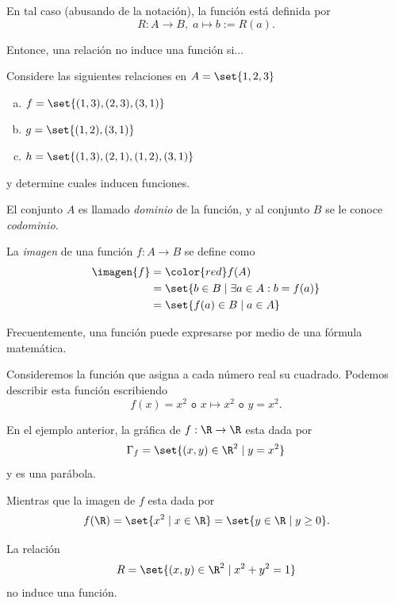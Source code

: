 	
	En tal caso (abusando de la notación), la función está definida por 
	$$
	R:A\to B, \; a \mapsto b:=R(a).
	$$



	Entonce, una relación no induce una función si...



	\begin{problema}
		Considere las siguientes relaciones en $A=\set{1,2,3}$
		\begin{enumerate}[(a)]
			\item $f=\set{(1,3),(2,3),(3,1)}$
			\item $g=\set{(1,2), (3,1)}$
			\item $h=\set{(1,3),(2,1),(1,2),(3,1)}$
		\end{enumerate}
		y determine cuales inducen funciones.
	\end{problema}
	




	El conjunto $A$ es llamado \emph{dominio} de la función, y al conjunto $B$ se le conoce \emph{codominio.}
	
	
	La \emph{imagen} de una función $f:A\to B$ se define como
	\begin{align}
		\imagen{f}&={\color{red} f(A)}\\
		&=\set{b \in B \mid \exists a \in A: b=f(a)}\\
		&=\set{f(a)\in B \mid a \in A}
	\end{align}
	



	Frecuentemente, una función puede expresarse por medio de una fórmula matemática. 
	\begin{problema}
		Consideremos la función que asigna a cada número real su cuadrado. Podemos describir esta función escribiendo
		$$
		f(x)=x^{2} \texttt{ o } x\mapsto x^{2} \texttt{ o } y=x^{2}.
		$$
	\end{problema}



	En el ejemplo anterior, la gráfica de $f:\R \to \R$ esta dada por 
	$$
	\Gamma_{f}=\set{(x,y)\in \R^{2}\mid y=x^{2}}
	$$ y es una parábola.
	
	
	Mientras que la imagen de $f$ esta dada por 
	$$
	f(\R)=\set{x^{2}\mid x\in \R}=\set{y\in \R \mid y\geq 0}.
	$$



	\begin{problema}
		La relación 
		$$
		R=\set{(x,y)\in \R^{2}\mid x^{2}+y^{2}=1}
		$$
		no induce una función.
	\end{problema}
	



